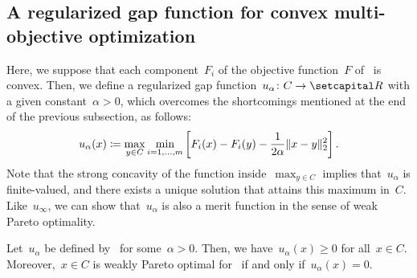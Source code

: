\documentclass[../../main]{subfiles}
\begin{document}
\subsection{A regularized gap function for convex multi-objective optimization} 
Here, we suppose that each component~$F_i$ of the objective function~$F$ of~ is convex.
Then, we define a regularized gap function~$u_\alpha \colon C \to \setR$ with a given constant~$\alpha > 0$, which overcomes the shortcomings mentioned at the end of the previous subsection, as follows:
\begin{equation} \label{eq:reg_gap_MO}
    u_\alpha(x) \coloneqq \max_{y \in C} \min_{i = 1, \dots, m} \left[ F_i(x) - F_i(y) - \frac{1}{2 \alpha}\lVert x - y\rVert_2^2 \right] 
.\end{equation} 
Note that the strong concavity of the function inside~$\max_{y \in C}$ implies that~$u_\alpha$ is finite-valued, and there exists a unique solution that attains this maximum in~$C$.
Like~$u_\infty$, we can show that~$u_\alpha$ is also a merit function in the sense of weak Pareto optimality.
\begin{theorem} 
    Let~$u_\alpha$ be defined by~ for some~$\alpha > 0$.
    Then, we have~$u_\alpha(x) \ge 0$ for all~$x \in C$.
    Moreover,~$x \in C$ is weakly Pareto optimal for~ if and only if~$u_\alpha(x) = 0$.
\end{theorem}
\end{document}
